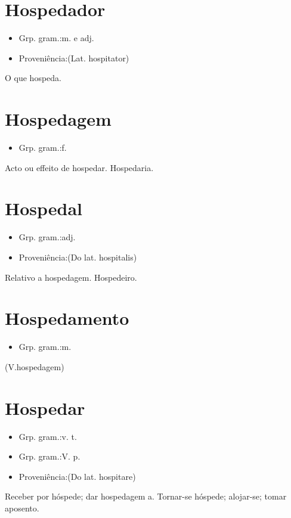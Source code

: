\documentclass{article}
\begin{document}
\section{Hospedador}
\begin{itemize}
\item {Grp. gram.:m.  e  adj.}
\end{itemize}
\begin{itemize}
\item {Proveniência:(Lat. \textunderscore hospitator\textunderscore )}
\end{itemize}
O que hospeda.
\section{Hospedagem}
\begin{itemize}
\item {Grp. gram.:f.}
\end{itemize}
Acto ou effeito de \textunderscore hospedar\textunderscore .
Hospedaria.
\section{Hospedal}
\begin{itemize}
\item {Grp. gram.:adj.}
\end{itemize}
\begin{itemize}
\item {Proveniência:(Do lat. \textunderscore hospitalis\textunderscore )}
\end{itemize}
Relativo a hospedagem.
Hospedeiro.
\section{Hospedamento}
\begin{itemize}
\item {Grp. gram.:m.}
\end{itemize}
(V.hospedagem)
\section{Hospedar}
\begin{itemize}
\item {Grp. gram.:v. t.}
\end{itemize}
\begin{itemize}
\item {Grp. gram.:V. p.}
\end{itemize}
\begin{itemize}
\item {Proveniência:(Do lat. \textunderscore hospitare\textunderscore )}
\end{itemize}
Receber por hóspede; dar hospedagem a.
Tornar-se hóspede; alojar-se; tomar aposento.
\end{document}
